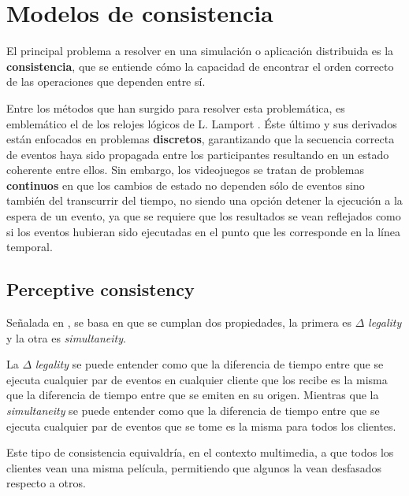 \section{Modelos de consistencia}


El principal problema a resolver en una simulación o aplicación distribuida es la \textbf{consistencia}, que se entiende cómo la capacidad de encontrar el orden correcto de las operaciones que dependen entre sí.

Entre los métodos que han surgido para resolver esta problemática, es emblemático el de los relojes lógicos de L. Lamport \cite{lamport1978time}. Éste último y sus derivados están enfocados en problemas \textbf{discretos}, garantizando que la secuencia correcta de eventos haya sido propagada entre los participantes resultando en un estado coherente entre ellos. Sin embargo, los videojuegos se tratan de problemas \textbf{continuos} en que los cambios de estado no dependen sólo de eventos sino también del transcurrir del tiempo,
no siendo una opción detener la ejecución a la espera de un evento, ya que se requiere que los resultados se vean reflejados como si los eventos hubieran sido ejecutadas en el punto que les corresponde en la línea temporal\cite{mauve2004local}.



\subsection{Perceptive consistency}

Señalada en \cite{bouillot2005fast}, se basa en que se cumplan dos propiedades, la primera es $\Delta$ \emph{legality} y la otra es \emph{simultaneity}.

La $\Delta$ \emph{legality} se puede entender como que la diferencia de tiempo entre que se ejecuta cualquier par de eventos en cualquier cliente que los recibe es la misma que la diferencia de tiempo entre que se emiten en su origen. Mientras que la \emph{simultaneity} se puede entender como que la diferencia de tiempo entre que se ejecuta cualquier par de eventos que se tome es la misma para todos los clientes.

Este tipo de consistencia equivaldría, en el contexto multimedia, a que todos los clientes vean una misma película, permitiendo que algunos la vean desfasados respecto a otros.

